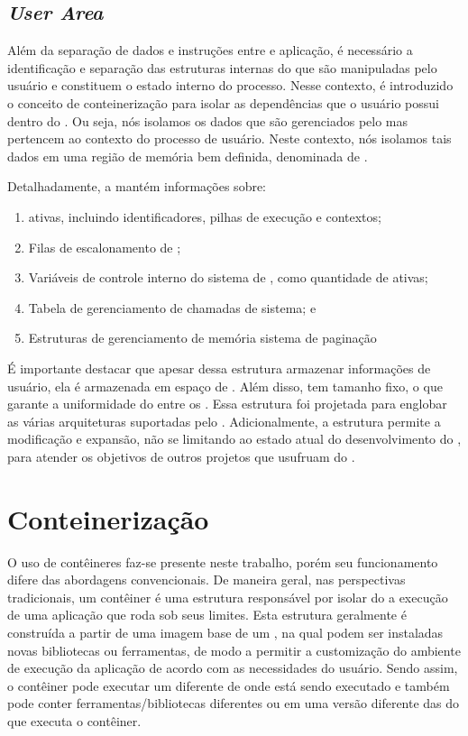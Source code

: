 \subsection{\textit{User Area}}
\label{sec.uarea}

    Além da separação de dados e instruções entre  e aplicação, é necessário a identificação e separação das estruturas internas do \so que são manipuladas pelo usuário e constituem o estado interno do processo. Nesse contexto, é introduzido o conceito de conteinerização para isolar as dependências que o usuário possui dentro do \cluster. Ou seja, nós isolamos os dados que são gerenciados pelo  mas pertencem ao contexto do processo de usuário. Neste contexto, nós isolamos tais dados em uma região de memória bem definida, denominada de \uarea. 

    Detalhadamente, a \uarea mantém informações sobre:
    \begin{enumerate}[label=(\roman*)]
        \item \Threads ativas, incluindo identificadores, pilhas de execução e contextos;
        \item Filas de escalonamento de \threads;
        \item Variáveis de controle interno do sistema de \threads, como quantidade de \threads ativas;
        \item Tabela de gerenciamento de chamadas de sistema; e
        \item Estruturas de gerenciamento de memória \eg sistema de paginação
    \end{enumerate}

    É importante destacar que apesar dessa estrutura armazenar informações de usuário, ela é armazenada em espaço de . Além disso, tem tamanho fixo, o que garante a uniformidade do  entre os \clusters. Essa estrutura foi projetada para englobar as várias arquiteturas suportadas pelo \nanvix. Adicionalmente, a estrutura permite a modificação e expansão, não se limitando ao estado atual do desenvolvimento do \nanvix, para atender os objetivos de outros projetos que usufruam do \nanvix.

\section{Conteinerização}
O uso de contêineres faz-se presente neste trabalho, porém seu funcionamento difere das abordagens convencionais. De maneira geral, nas perspectivas tradicionais, um contêiner é uma estrutura responsável por isolar do \so a execução de uma aplicação que roda sob seus limites. Esta estrutura geralmente é construída a partir de uma imagem base de um \so, na qual podem ser instaladas novas bibliotecas ou ferramentas, de modo a permitir a customização do ambiente de execução da aplicação de acordo com as necessidades do usuário. Sendo assim, o contêiner pode executar um \so diferente de onde está sendo executado e também pode conter ferramentas/bibliotecas diferentes ou em uma versão diferente das do \so que executa o contêiner.

